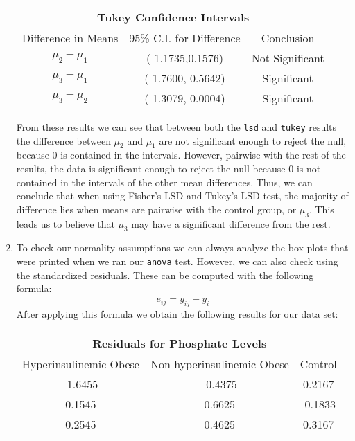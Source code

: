 \documentclass[oneside,10pt]{article}
\begin{document}
\begin{enumerate}[label=(\alph*)]
\begin{center}
\begin{tabular}{ c c c }
			\end{tabular}
		\end{center}
		\vspace*{4mm}
		\begin{center}
			\begin{tabular}{ c c c }
				\multicolumn{3}{c}{Tukey Confidence Intervals}\\
				\hline
				Difference in Means & 95\% C.I. for Difference & Conclusion\\
				\hline
				$\mu_2-\mu_1$ & (-1.1735,0.1576) & Not Significant\\
				$\mu_3-\mu_1$ & (-1.7600,-0.5642) & Significant\\
				$\mu_3-\mu_2$ & (-1.3079,-0.0004) & Significant\\
				\hline
			\end{tabular}
		\end{center}
		From these results we can see that between both the \texttt{lsd} and \texttt{tukey} results the difference between $\mu_2$ and $\mu_1$ are not significant enough to reject the null, because 0 is contained in the intervals. However, pairwise with the rest of the results, the data is significant enough to reject the null because 0 is not contained in the intervals of the other mean differences. Thus, we can conclude that when using Fisher's LSD and Tukey's LSD test, the majority of difference lies when means are pairwise with the control group, or $\mu_3$. This leads us to believe that $\mu_3$ may have a significant difference from the rest.
		\item To check our normality assumptions we can always analyze the box-plots that were printed when we ran our \texttt{anova} test. However, we can also check using the standardized residuals. These can be computed with the following formula: $$e_{ij}=y_{ij}-\bar{y}_i$$ After applying this formula we obtain the following results for our data set:
	\begin{adjustwidth}{-2cm}{0pt}
		\begin{minipage}{0.45\linewidth}
			\begin{tabular}{ c c c }
				\multicolumn{3}{c}{Residuals for Phosphate Levels}\\
				\hline
				Hyperinsulinemic Obese & Non-hyperinsulinemic Obese & Control\\
				\hline
				-1.6455 & -0.4375 & 0.2167\\
				0.1545 & 0.6625 & -0.1833\\
				0.2545 & 0.4625 & 0.3167\\

\end{tabular}
\end{minipage}
\end{adjustwidth}
\end{enumerate}
\end{document}
